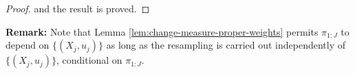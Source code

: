 \documentclass{article}
\begin{document}
\begin{proof}
    and the result is proved. 



    
    
\end{proof}


\textbf{Remark:} Note that Lemma \ref{lem:change-measure-proper-weights} permits $\pi_{1:J}$ to depend on $\{(X_j,u_j)\}$ as long as the resampling is carried out independently of $\{(X_j,u_j)\}$, conditional on $\pi_{1:J}$.
\end{document}
